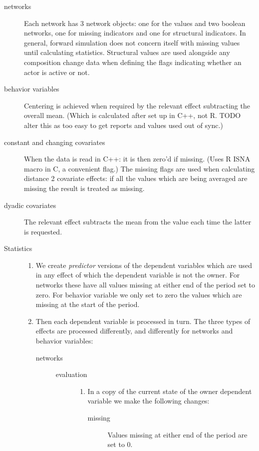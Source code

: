 \documentclass[12pt,a4paper]{article}
\renewcommand{\=}{\,=\,}
\newcommand{\+}{\,+\,}
\begin{document}
\begin{description}
\item[networks] Each network has 3 network objects: one for the values and two
  boolean networks, one for missing indicators and one for structural
  indicators. In general, forward simulation does not concern itself with
  missing values until calculating statistics. Structural values are used
  alongside any composition change data when defining the flags indicating
  whether an actor is active or not.
\item[behavior variables]
  Centering is achieved when required by the relevant effect subtracting the
  overall mean. (Which is calculated after set up in C++, not R. TODO alter this
  as too easy to get reports and values used out of sync.)
\item[constant and changing covariates] When the data is read in C++: it is then
  zero'd if missing. (Uses R ISNA macro in C, a convenient flag.) The missing
  flags are used when calculating distance 2 covariate effects: if all the
  values which are being averaged are missing the result is treated as missing.
\item[dyadic covariates] The relevant effect subtracts the mean from the value
  each time the latter is requested.
\item[Statistics]\hfill
\begin{enumerate}
\item We create \emph{predictor} versions of the dependent variables which are
  used in any effect of which the dependent variable is not the owner. For
  networks these have all values missing at either end of the period set to
  zero. For behavior variable we only set to zero the values which are missing
  at the start of the period.
\item Then each dependent variable is processed in turn. The three types of
  effects are processed differently, and differently for networks and behavior
  variables:
  \begin{description}
  \item[networks]\hfill
    \begin{description}
    \item[evaluation]\hfill
      \begin{enumerate}
      \item In a copy of the current state of the owner dependent
        variable we make the following changes:
        \begin{description}
        \item[missing] Values missing at either end of the period are set to 0.

\end{description}
\end{enumerate}
\end{description}
\end{description}
\end{enumerate}
\end{description}
\end{document}
